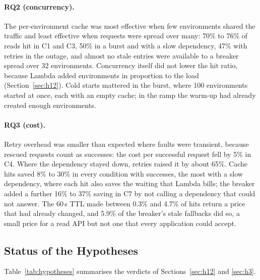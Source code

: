 \documentclass[10pt]{article}
\begin{document}
\paragraph{RQ2 (concurrency).} The per-environment cache was most effective
when few environments shared the traffic and least effective when requests were
spread over many: 70\% to 76\% of reads hit in C1 and C3, 50\% in a burst and
with a slow dependency, 47\% with retries in the outage, and almost no stale
entries were available to a breaker spread over 32 environments. Concurrency
itself did not lower the hit ratio, because Lambda added environments in
proportion to the load (Section~\ref{sec:h12}). Cold starts mattered in the
burst, where 100 environments started at once, each with an empty cache; in
the ramp the warm-up had already created enough environments.

\paragraph{RQ3 (cost).} Retry overhead was smaller than expected where faults
were transient, because rescued requests count as successes: the cost per
successful request fell by 5\% in C4. Where the dependency stayed down, retries
raised it by about 65\%. Cache hits saved 8\% to 30\% in every condition with
successes, the most with a slow dependency, where each hit also saves the
waiting that Lambda bills; the breaker added a further 16\% to 37\% saving in
C7 by not calling a dependency that could not answer. The 60\,s TTL made
between 0.3\% and 4.7\% of hits return a price that had already changed, and
5.9\% of the breaker's stale fallbacks did so, a small price for a read API but
not one that every application could accept.

\subsection{Status of the Hypotheses}
Table~\ref{tab:hypotheses} summarises the verdicts of Sections~\ref{sec:h12}
and \ref{sec:h3}.
\end{document}

